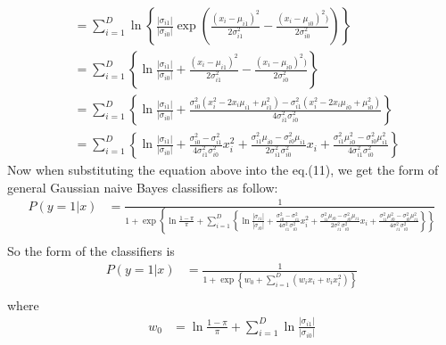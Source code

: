 \documentclass[UTF8,12pt, a4paper]{ctexart}
\begin{document}
\begin{tcolorbox}
\begin{align*}
{      } \\
      &=\sum_{i=1}^{D}\ln \left\{ \frac{|\sigma_{i1}|}{|\sigma_{i0}|} \exp \left(
        \frac{(x_i-\mu_{i1})^2}{2\sigma_{i1} ^2}
        - \frac{(x_i-\mu_{i0})^2)}{2\sigma_{i0} ^2}
      \right) \right\}\\
      &=\sum_{i=1}^{D}\left\{
        \ln \frac{|\sigma_{i1}|}{|\sigma_{i0}|}
        + \frac{(x_i-\mu_{i1})^2}{2\sigma_{i1} ^2}
        - \frac{(x_i-\mu_{i0})^2)}{2\sigma_{i0} ^2}
      \right\} \\
      &=\sum_{i=1}^{D}\left\{
        \ln \frac{|\sigma_{i1}|}{|\sigma_{i0}|}
        +\frac{
         \sigma_{i0}^2 (x_i^2 -2x_i\mu_{i1} + \mu_{i1}^{2})
          - \sigma_{i1}^2 (x_i^2 -2x_i\mu_{i0} + \mu_{i0}^{2})
        }{
        4\sigma_{i1}^2\sigma_{i0}^2
        }\right\} \\
      &=\sum_{i=1}^{D}\left\{
        \ln \frac{|\sigma_{i1}|}{|\sigma_{i0}|}
        + \frac{\sigma_{i0}^2-\sigma_{i1}^2}{4\sigma_{i1}^2\sigma_{i0}^2}x_i^2
        + \frac{\sigma_{i1}^2\mu_{i0}-\sigma_{i0}^2\mu_{i1}}{2\sigma_{i1}^2\sigma_{i0}^2}x_i
        + \frac{\sigma_{i1}^2\mu_{i0}^2-\sigma_{i0}^2\mu_{i1}^2}{4\sigma_{i1}^2\sigma_{i0}^2}
        \right\}
\end{align*}
Now when substituting the equation above into the eq.(11), we get the form of general Gaussian naive Bayes classifiers as follow:
\begin{equation}
  \begin{aligned}
    P(y=1|x) & = \frac{1}{1+\exp\left\{ \ln\frac{1-\pi}{\pi} 
    + \sum_{i=1}^{D}\left\{
      \ln \frac{|\sigma_{i1}|}{|\sigma_{i0}|}
      + \frac{\sigma_{i0}^2-\sigma_{i1}^2}{4\sigma_{i1}^2\sigma_{i0}^2}x_i^2
      + \frac{\sigma_{i1}^2\mu_{i0}-\sigma_{i0}^2\mu_{i1}}{2\sigma_{i1}^2\sigma_{i0}^2}x_i
      + \frac{\sigma_{i1}^2\mu_{i0}^2-\sigma_{i0}^2\mu_{i1}^2}{4\sigma_{i1}^2\sigma_{i0}^2}
      \right\}
    \right\}}  \\
  \end{aligned}
\end{equation}
So the form of the classifiers is
\begin{equation}
  \begin{aligned}
    P(y=1|x) & = \frac{1}{1+\exp\left\{
      w_0
      + \sum_{i=1}^{D}{(w_ix_i + v_ix_i^2)}
    \right\}}  \\
  \end{aligned}
\end{equation}
where
\begin{align*}
  w_0 &= \ln\frac{1-\pi}{\pi}+ \sum_{i=1}^D{\ln\frac{|\sigma_{i1}|}{|\sigma_{i0}|} 
}
\end{align*}
\end{tcolorbox}
\end{document}
